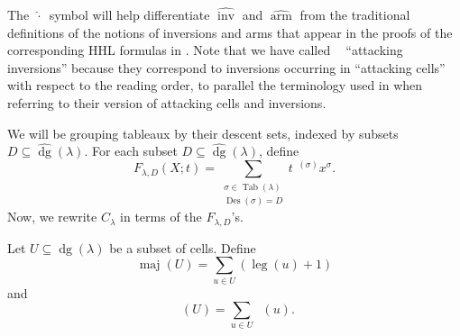 \documentclass[ALCO,Unicode]{cedram}
\DeclareMathOperator{\PQT}{Tab}
\DeclareMathOperator{\dg}{dg}
\DeclareMathOperator{\arm}{arm}
\DeclareMathOperator{\leg}{leg}
\DeclareMathOperator{\maj}{maj}
\DeclareMathOperator{\inv}{inv}
\DeclareMathOperator{\Des}{Des}
\DeclareMathOperator{\invtwo}{\widehat{\inv}}
\DeclareMathOperator{\armtwo}{\widehat{\arm}}
\begin{document}
\begin{remark} 
The $\,\widehat{\cdot}\,$ symbol will help differentiate $\widehat{\inv}$ and $\widehat{\arm}$ from the traditional definitions of the notions of inversions and arms that appear in the proofs of the corresponding HHL formulas  in \cite[Section 3]{HHL05}. Note that we have called $\invtwo$ ``attacking inversions'' because they correspond to inversions occurring in ``attacking cells'' with respect to the reading order, to parallel the terminology used in \cite{HHL05} when referring to their version of attacking cells and inversions. 
\end{remark}

We will be grouping tableaux by their descent sets, indexed by subsets $D\subseteq \widehat{\dg}(\lambda)$. For each subset $D\subseteq \widehat{\dg}(\lambda)$, define
\begin{equation}\label{eq:F_D}
F_{\lambda,D}(X;t) = \sum_{\substack{\sigma\in\PQT(\lambda)\\ \Des(\sigma)=D}}  t^{\invtwo(\sigma)} x^{\sigma}.
\end{equation}
Now, we rewrite $C_{\lambda}$ in terms of the $F_{\lambda,D}$'s.

\begin{defn}
Let $U\subseteq \dg(\lambda)$ be a subset of cells. Define
\[
\maj(U) = \sum_{u\in U} (\leg(u)+1)
\]
and
\[
\armtwo(U)=\sum_{u\in U} \armtwo(u).
\]
\end{defn}
\end{document}

